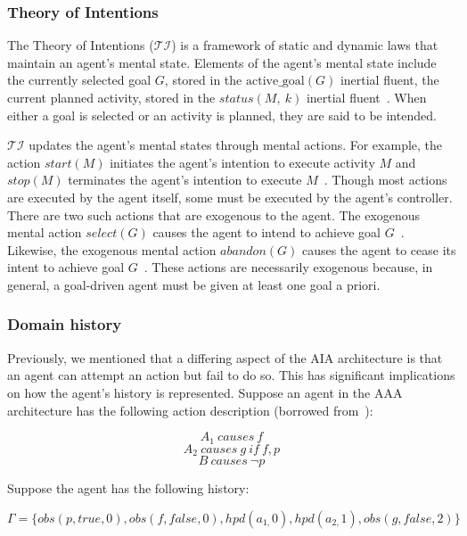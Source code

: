 \subsubsection{Theory of Intentions}
\label{subsubsec:theory_of_intentions}

The Theory of Intentions ($\mathcal{TI}$) is a framework of static and dynamic laws that maintain an agent's mental state.
Elements of the agent's mental state include the currently selected goal $G$, stored in the $\mathrm{active\_goal}\left(G\right)$ inertial fluent, the current planned activity, stored in the $status(M,\ k)$ inertial fluent~\cite{blount_towards_2014}.
When either a goal is selected or an activity is planned, they are said to be intended.

$\mathcal{TI}$ updates the agent's mental states through mental actions.
For example, the action $start(M)$ initiates the agent's intention to execute activity $M$ and $stop(M)$ terminates the agent's intention to execute $M$~\cite{blount_towards_2014}.
Though most actions are executed by the agent itself, some must be executed by the agent's controller.
There are two such actions that are exogenous to the agent.
The exogenous mental action $select(G)$ causes the agent to intend to achieve goal $G$~\cite{blount_towards_2014}.
Likewise, the exogenous mental action $abandon(G)$ causes the agent to cease its intent to achieve goal $G$~\cite{blount_towards_2014}.
These actions are necessarily exogenous because, in general, a goal-driven agent must be given at least one goal a priori.

\subsubsection{Domain history}
\label{subsubsec:domain_history}

Previously, we mentioned that a differing aspect of the AIA architecture is that an agent can attempt an action but fail to do so.
This has significant implications on how the agent's history is represented.
Suppose an agent in the AAA architecture has the following action description (borrowed from~\cite{blount_towards_2014}):

$$
A_1 \ causes \ f
$$
$$
A_2 \ causes \ g \ if \ f, p
$$
$$
B \ causes \ \neg p
$$

Suppose the agent has the following history:

$$
\Gamma=\{obs\left(p,true,0\right),obs\left(f,false,0\right),hpd\left(a_{1,}0\right),hpd\left(a_{2,}1\right),obs\left(g,false,2\right)\}
$$

